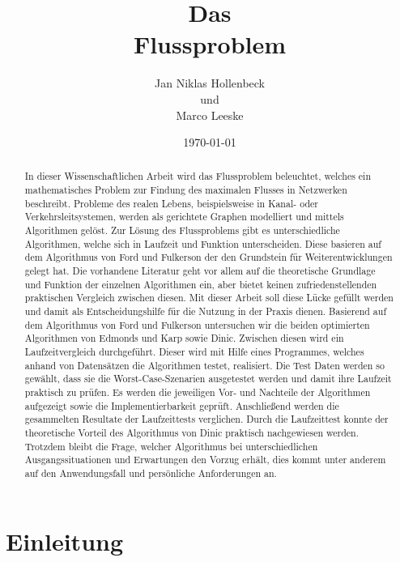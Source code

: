 \documentclass[a4paper]{llncs}
\title{Das \\ Flussproblem}
\author{Jan Niklas Hollenbeck \\ und \\ Marco Leeske}
\institute{Hochschule Darmstadt}
\date{\today}
\begin{document}
\maketitle

\begin{abstract}

In dieser Wissenschaftlichen Arbeit wird das Flussproblem beleuchtet, welches ein mathematisches Problem zur Findung des maximalen Flusses in Netzwerken beschreibt.
 Probleme des realen Lebens, beispielsweise in Kanal- oder Verkehrsleitsystemen, werden als gerichtete Graphen modelliert und mittels Algorithmen gelöst.
 Zur Lösung des Flussproblems gibt es unterschiedliche Algorithmen, welche sich in Laufzeit und Funktion unterscheiden. Diese basieren auf dem Algorithmus von Ford und Fulkerson der den Grundstein für Weiterentwicklungen gelegt hat.
 Die vorhandene Literatur geht vor allem auf die theoretische Grundlage und Funktion der einzelnen Algorithmen ein,  aber bietet keinen zufriedenstellenden praktischen Vergleich zwischen diesen.
 Mit dieser Arbeit soll diese Lücke gefüllt werden und damit als Entscheidungshilfe für die Nutzung in der Praxis dienen.
Basierend auf dem Algorithmus von Ford und Fulkerson untersuchen wir die beiden optimierten Algorithmen von Edmonds und Karp sowie Dinic.
Zwischen diesen wird ein Laufzeitvergleich durchgeführt.
Dieser wird mit Hilfe eines Programmes, welches anhand von Datensätzen die Algorithmen testet, realisiert.
Die Test Daten werden so gewählt, dass sie die Worst-Case-Szenarien ausgetestet werden und damit ihre Laufzeit praktisch zu prüfen.
Es werden die jeweiligen Vor- und Nachteile der Algorithmen aufgezeigt sowie die Implementierbarkeit geprüft. Anschließend werden die gesammelten Resultate der Laufzeittests verglichen.
Durch die Laufzeittest konnte der theoretische Vorteil des Algorithmus von Dinic praktisch nachgewiesen werden.
 Trotzdem bleibt die Frage, welcher Algorithmus bei unterschiedlichen Ausgangssituationen und Erwartungen den Vorzug erhält, dies kommt unter anderem auf den Anwendungsfall und persönliche Anforderungen an.

\end{abstract}


\section{Einleitung}
\label{Einleitung}
\end{document}
